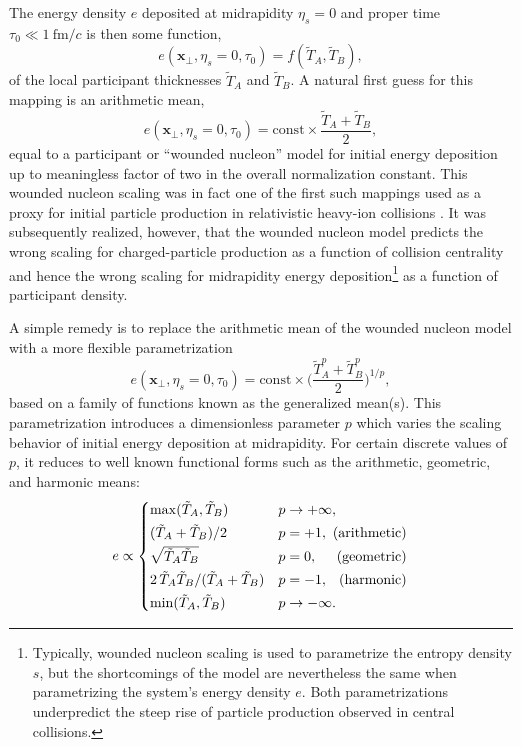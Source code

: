 \documentclass[aps,prc,reprint,amsmath,nofootinbib]{revtex4-1}
\newcommand{\fmc}{\ensuremath{\text{fm}/c}}
\newcommand{\T}{\tilde{T}}
\newcommand{\xv}{\mathbf x}
\begin{document}
The energy density $e$ deposited at midrapidity $\eta_s=0$ and proper time $\tau_0 \ll 1~\fmc$ is then some function,
\begin{equation}
  e(\xv_\perp, \eta_s=0, \tau_0) = f(\T_A, \T_B),
\end{equation}
of the local participant thicknesses $\T_A$ and $\T_B$.
A natural first guess for this mapping is an arithmetic mean,
\begin{equation}
  e(\xv_\perp, \eta_s=0, \tau_0) = \text{const} \times \frac{\T_A + \T_B}{2},
\end{equation}
equal to a participant or ``wounded nucleon'' model for initial energy deposition up to meaningless factor of two in the overall normalization constant.
This wounded nucleon scaling was in fact one of the first such mappings used as a proxy for initial particle production in relativistic heavy-ion collisions \cite{Bialas:1976ed}.
It was subsequently realized, however, that the wounded nucleon model predicts the wrong scaling for charged-particle production as a function of collision centrality \cite{Kharzeev:2000ph} and hence the wrong scaling for midrapidity energy deposition\footnote{Typically, wounded nucleon scaling is used to parametrize the entropy density $s$, but the shortcomings of the model are nevertheless the same when parametrizing the system's energy density $e$. Both parametrizations underpredict the steep rise of particle production observed in central collisions.}
as a function of participant density.

A simple remedy is to replace the arithmetic mean of the wounded nucleon model with a more flexible parametrization
\begin{equation}
  \label{eq:gmean}
  e(\xv_\perp, \eta_s=0, \tau_0) = \text{const} \times \bigg( \frac{\T_A^p + \T_B^p}{2} \bigg)^{1/p},
\end{equation}
based on a family of functions known as the generalized mean(s).
This parametrization introduces a dimensionless parameter $p$ which varies the scaling behavior of initial energy deposition at midrapidity.
For certain discrete values of $p$, it reduces to well known functional forms such as the arithmetic, geometric, and harmonic means:
\begin{equation}
  \newlength{\extraspace}
  \setlength{\extraspace}{0.5ex}
  e \propto
  \begin{cases}
    \max(\T_A, \T_B) & p \rightarrow +\infty, \\[\extraspace]
    (\T_A + \T_B)/2 & p = +1, \hfill \text{ (arithmetic)} \\[\extraspace]
    \sqrt{\T_A \T_B} & p = 0, \hfill \text{ (geometric)} \\[\extraspace]
    2\, \T_A \T_B/(\T_A + \T_B) & p = -1, \hfill \text{ (harmonic)} \\[\extraspace]
    \min(\T_A, \T_B) & p \rightarrow -\infty.
  \end{cases}
  \label{eq:trento_p}
\end{equation}
\end{document}
